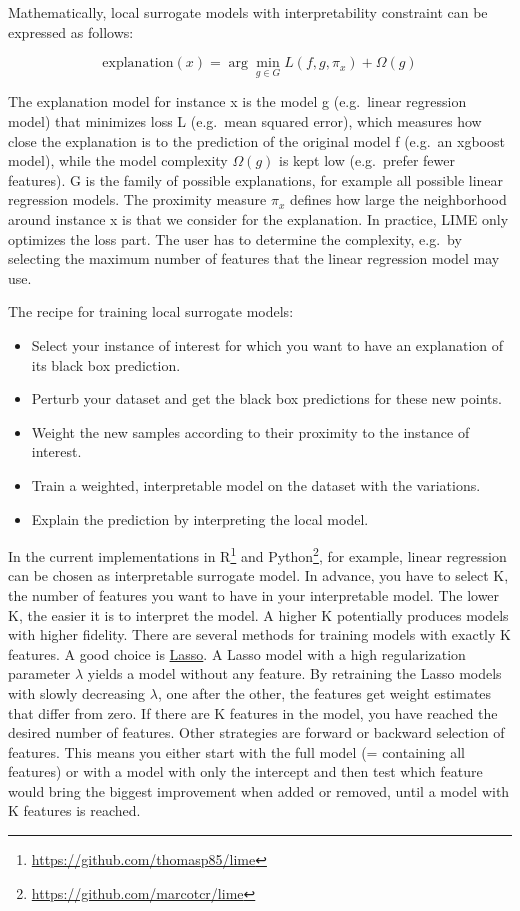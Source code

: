 \documentclass[
  11pt,
]{scrbook}
\providecommand{\tightlist}{%
  \setlength{\itemsep}{0pt}\setlength{\parskip}{0pt}}
\renewcommand{\href}[2]{#2\footnote{\url{#1}}}
\begin{document}
Mathematically, local surrogate models with interpretability constraint can be expressed as follows:

\[\text{explanation}(x)=\arg\min_{g\in{}G}L(f,g,\pi_x)+\Omega(g)\]

The explanation model for instance x is the model g (e.g.~linear regression model) that minimizes loss L (e.g.~mean squared error), which measures how close the explanation is to the prediction of the original model f (e.g.~an xgboost model), while the model complexity \(\Omega(g)\) is kept low (e.g.~prefer fewer features).
G is the family of possible explanations, for example all possible linear regression models.
The proximity measure \(\pi_x\) defines how large the neighborhood around instance x is that we consider for the explanation.
In practice, LIME only optimizes the loss part.
The user has to determine the complexity, e.g.~by selecting the maximum number of features that the linear regression model may use.

The recipe for training local surrogate models:

\begin{itemize}
\tightlist
\item
  Select your instance of interest for which you want to have an explanation of its black box prediction.
\item
  Perturb your dataset and get the black box predictions for these new points.
\item
  Weight the new samples according to their proximity to the instance of interest.
\item
  Train a weighted, interpretable model on the dataset with the variations.
\item
  Explain the prediction by interpreting the local model.
\end{itemize}

In the current implementations in \href{https://github.com/thomasp85/lime}{R} and \href{https://github.com/marcotcr/lime}{Python}, for example, linear regression can be chosen as interpretable surrogate model.
In advance, you have to select K, the number of features you want to have in your interpretable model.
The lower K, the easier it is to interpret the model.
A higher K potentially produces models with higher fidelity.
There are several methods for training models with exactly K features.
A good choice is \protect\hyperlink{lasso}{Lasso}.
A Lasso model with a high regularization parameter \(\lambda\) yields a model without any feature.
By retraining the Lasso models with slowly decreasing \(\lambda\), one after the other, the features get weight estimates that differ from zero.
If there are K features in the model, you have reached the desired number of features.
Other strategies are forward or backward selection of features.
This means you either start with the full model (= containing all features) or with a model with only the intercept and then test which feature would bring the biggest improvement when added or removed, until a model with K features is reached.
\end{document}
